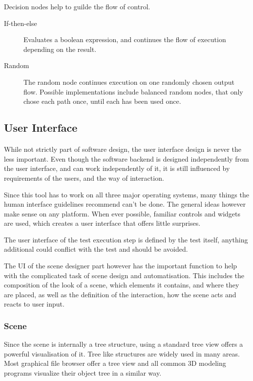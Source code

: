 Decision nodes help to guilde the flow of control.

\begin{description}
\item[If-then-else]
Evaluates a boolean expression, and continues the flow of execution depending on the result.

\item[Random]
The random node continues execution on one randomly chosen output flow.
Possible implementations include balanced random nodes, that only chose each path once, until each has been used once.

\end{description}


\subsection{User Interface}
\paragraph{}
While not strictly part of software design, the user interface design is never the less important\cite{hig}.
Even though the software backend is designed independently from the user interface, and can work independently of it, it is still influenced by requirements of the users, and the way of interaction.

Since this tool has to work on all three major operating systems, many things the human interface guidelines recommend can't be done.
The general ideas however make sense on any platform.
When ever possible, familiar controls and widgets are used, which creates a user interface that offers little surprises.

The user interface of the test execution step is defined by the test itself, anything additional could conflict with the test and should be avoided.

The UI of the scene designer part however has the important function to help with the complicated task of scene design and automatisation. This includes the composition of the look of a scene, which elements it contains, and where they are placed, as well as the definition of the interaction, how the scene acts and reacts to user input.

\subsubsection{Scene}
Since the scene is internally a tree structure, using a standard tree view offers a powerful visualisation of it.
Tree like structures are widely used in many areas.
Most graphical file browser offer a tree view and all common 3D modeling programs visualize their object tree in a similar way.


